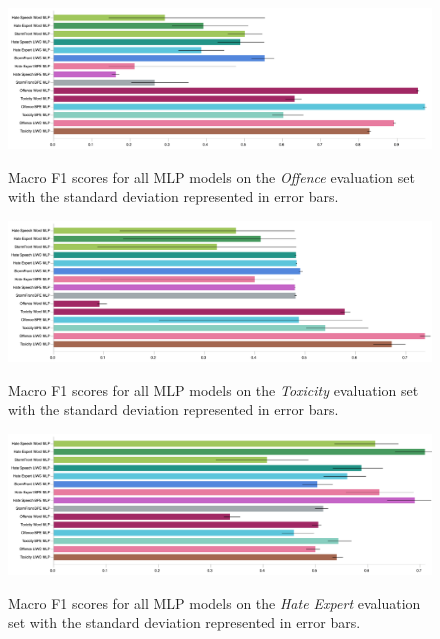 \begin{figure}
\begin{minipage}{\textwidth}
    \centering
    \includegraphics[width=\textwidth]{all_mlp_davidson_test.pdf}
    \caption{Macro F1 scores for all MLP models on the \textit{Offence} evaluation set with the standard deviation represented in error bars.}
    \label{fig:davidson_mlp_test}
  \vfill
    \includegraphics[width=\textwidth]{all_mlp_wulczyn_test.pdf}
    \caption{Macro F1 scores for all MLP models on the \textit{Toxicity} evaluation set with the standard deviation represented in error bars.}
    \label{fig:wulczyn_mlp_test}
  \vfill
    \includegraphics[width=\textwidth]{all_mlp_waseem_test.pdf}
    \caption{Macro F1 scores for all MLP models on the \textit{Hate Expert} evaluation set with the standard deviation represented in error bars.}
    \label{fig:waseem_mlp_test}
\end{minipage}
\end{figure}

